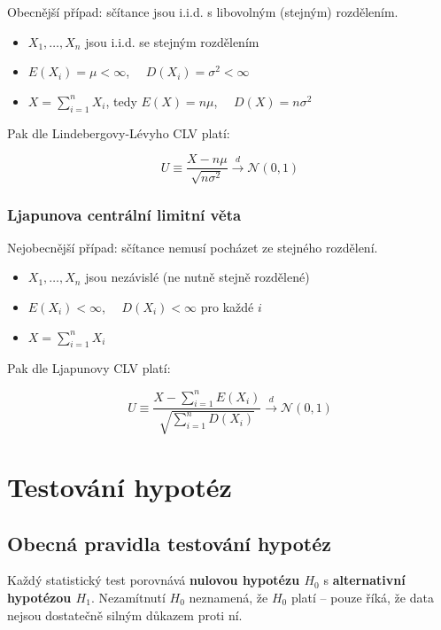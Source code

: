 \documentclass[a4paper, 11pt]{article}
\begin{document}
Obecnější případ: sčítance jsou i.i.d. s libovolným (stejným) rozdělením.

\begin{itemize}[noitemsep]
    \item $X_1, \ldots, X_n$ jsou i.i.d. se stejným rozdělením
    \item $E(X_i) = \mu < \infty$, $\quad D(X_i) = \sigma^2 < \infty$
    \item $X = \sum_{i=1}^{n} X_i$, tedy $E(X) = n\mu$, $\quad D(X) = n\sigma^2$
\end{itemize}

Pak dle Lindebergovy-Lévyho CLV platí:

\begin{equation*}
    U \equiv \frac{X - n\mu}{\sqrt{n\sigma^2}} \xrightarrow{d} \mathcal{N}(0,1)
\end{equation*}

\subsubsection{Ljapunova centrální limitní věta}

Nejobecnější případ: sčítance nemusí pocházet ze stejného rozdělení.

\begin{itemize}[noitemsep]
    \item $X_1, \ldots, X_n$ jsou nezávislé (ne nutně stejně rozdělené)
    \item $E(X_i) < \infty$, $\quad D(X_i) < \infty$ pro každé $i$
    \item $X = \sum_{i=1}^{n} X_i$
\end{itemize}

Pak dle Ljapunovy CLV platí:

\begin{equation*}
    U \equiv \frac{X - \sum_{i=1}^{n}E(X_i)}{\sqrt{\sum_{i=1}^{n}D(X_i)}}
    \xrightarrow{d} \mathcal{N}(0,1)
\end{equation*}

\clearpage
\section{Testování hypotéz}

\subsection{Obecná pravidla testování hypotéz}

Každý statistický test porovnává \textbf{nulovou hypotézu $H_0$} s \textbf{alternativní hypotézou $H_1$}.
Nezamítnutí $H_0$ neznamená, že $H_0$ platí -- pouze říká, že data nejsou dostatečně silným důkazem proti ní.
\end{document}

